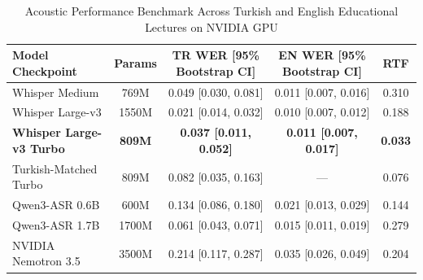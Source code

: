 \documentclass[a4paper,12pt]{report}
\begin{document}
\begin{table}[h!]
\centering
\caption{Acoustic Performance Benchmark Across Turkish and English Educational Lectures on NVIDIA GPU}
\label{table:asr_benchmark}
\baselineskip
\footnotesize\setlength{\tabcolsep}{3pt}
\begin{tabularx}{\textwidth}{|>{\RaggedRight\arraybackslash}X|c|c|c|c|}
\hline
\textbf{Model Checkpoint} & \textbf{Params} & \textbf{TR WER [95\% Bootstrap CI]} & \textbf{EN WER [95\% Bootstrap CI]} & \textbf{RTF} \\ \hline
Whisper Medium & 769M & 0.049 [0.030, 0.081] & 0.011 [0.007, 0.016] & 0.310 \\ \hline
Whisper Large-v3 & 1550M & 0.021 [0.014, 0.032] & 0.010 [0.007, 0.012] & 0.188 \\ \hline
\textbf{Whisper Large-v3 Turbo} & \textbf{809M} & \textbf{0.037 [0.011, 0.052]} & \textbf{0.011 [0.007, 0.017]} & \textbf{0.033} \\ \hline
Turkish-Matched Turbo & 809M & 0.082 [0.035, 0.163] & --- & 0.076 \\ \hline
Qwen3-ASR 0.6B & 600M & 0.134 [0.086, 0.180] & 0.021 [0.013, 0.029] & 0.144 \\ \hline
Qwen3-ASR 1.7B & 1700M & 0.061 [0.043, 0.071] & 0.015 [0.011, 0.019] & 0.279 \\ \hline
NVIDIA Nemotron 3.5 & 3500M & 0.214 [0.117, 0.287] & 0.035 [0.026, 0.049] & 0.204 \\ \hline
\end{tabularx}
\end{table}
\end{document}
